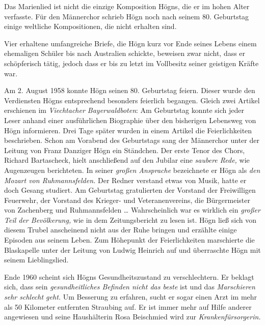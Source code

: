 \documentclass{book}
\newcommand{\zitat}[1]{\textit{#1}}
\begin{document}
Das Marienlied ist nicht die einzige Komposition Högns, die er im hohen
Alter verfasste. Für den Männerchor schrieb Högn noch nach seinem 80.
Geburtstag einige weltliche Kompositionen, die nicht erhalten sind.

Vier erhaltene umfangreiche Briefe, die Högn kurz vor Ende seines
Lebens einem ehemaligen Schüler bis nach Australien schickte,
beweisen zwar nicht, dass er schöpferisch tätig, jedoch dass er bis zu
letzt im Vollbesitz seiner geistigen Kräfte war.

Am 2. August 1958 konnte Högn seinen 80. Geburtstag feiern. Dieser wurde
den Verdiensten Högns entsprechend besonders feierlich begangen. Gleich
zwei Artikel erschienen im \textit{Viechtacher Bayerwaldboten}: Am
Geburtstag konnte sich jeder Leser anhand einer ausführlichen
Biographie über den bisherigen Lebensweg von Högn informieren. Drei
Tage später wurden in einem Artikel die Feierlichkeiten beschrieben.
Schon am Vorabend des Geburtstags sang der Männerchor unter der Leitung
von Franz Danziger Högn ein Ständchen. Der erste Tenor des Chors,
Richard Bartascheck, hielt anschließend auf den Jubilar eine
\textit{saubere Rede,} wie Augenzeugen berichteten. In seiner
\textit{großen Ansprache} bezeichnete er Högn als \textit{den Mozart
von Ruhmannsfelden.} Der Redner verstand etwas von Musik, hatte er doch
Gesang studiert. Am Geburtstag gratulierten der Vorstand der
Freiwilligen Feuerwehr, der Vorstand des Krieger- und
Veteranenvereins, die Bürgermeister von Zachenberg und Ruhmannsfelden
… Wahrscheinlich war es wirklich ein \textit{großer Teil der
Bevölkerung,} wie in dem Zeitungsbericht zu lesen ist. Högn ließ sich
von diesem Trubel anscheinend nicht aus der Ruhe bringen und erzählte
einige Episoden aus seinem Leben. Zum Höhepunkt der Feierlichkeiten
marschierte die Blaskapelle unter der Leitung von Ludwig Heinrich auf
und überraschte Högn mit seinem Lieblingslied.

Ende 1960 scheint sich Högns Gesundheitszustand zu verschlechtern. Er
beklagt sich, dass sein \zitat{gesundheitliches Befinden
nicht das beste} ist und das \zitat{Marschieren sehr
schlecht geht.} Um Besserung zu erfahren, sucht er sogar einen Arzt im
mehr als 50 Kilometer entfernten Straubing auf. Er ist immer mehr auf
Hilfe anderer angewiesen und seine Haushälterin Rosa Beischmied wird
zur \zitat{Krankenfürsorgerin.}
\end{document}
